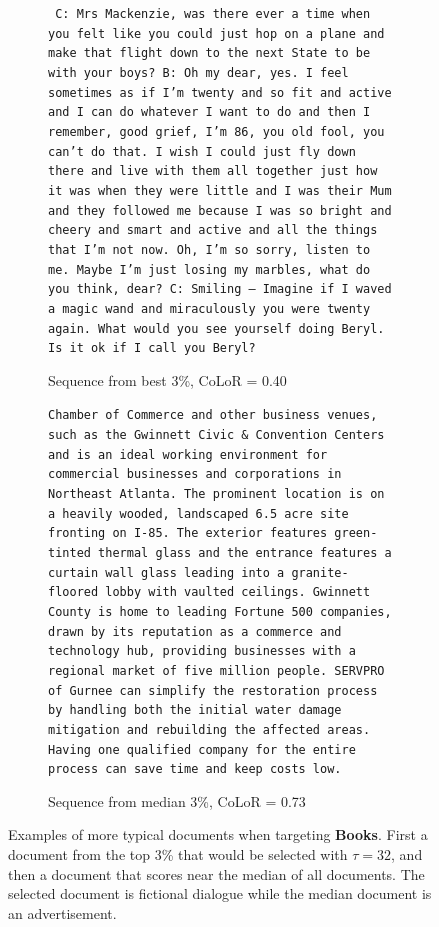 \documentclass{article}
\begin{document}
\begin{figure}[h]
    \begin{subfigure}[b]{0.45\textwidth}
        \centering
        {\small
        \texttt{
    C: Mrs Mackenzie, was there ever a time when you felt like you could just hop on a plane and make that flight down to the next State to be with your boys?
B: Oh my dear, yes. I feel sometimes as if I’m twenty and so fit and active and I can do whatever I want to do and then I remember, good grief, I’m 86, you old fool, you can’t do that. I wish I could just fly down there and live with them all together just how it was when they were little and I was their Mum and they followed me because I was so bright and cheery and smart and active and all the things that I’m not now. Oh, I’m so sorry, listen to me. Maybe I’m just losing my marbles, what do you think, dear?
C: Smiling – Imagine if I waved a magic wand and miraculously you were twenty again. What would you see yourself doing Beryl. Is it ok if I call you Beryl?
}}
        \caption{Sequence from best 3\%, CoLoR = 0.40}
    \end{subfigure}
    \hfill
    \begin{subfigure}[b]{0.45\textwidth}
        \centering
        {\small
    \texttt{Chamber of Commerce and other business venues, such as the Gwinnett Civic \& Convention Centers and is an ideal working environment for commercial businesses and corporations in Northeast Atlanta. The prominent location is on a heavily wooded, landscaped 6.5 acre site fronting on I-85. The exterior features green-tinted thermal glass and the entrance features a curtain wall glass leading into a granite-floored lobby with vaulted ceilings. Gwinnett County is home to leading Fortune 500 companies, drawn by its reputation as a commerce and technology hub, providing businesses with a regional market of five million people.                     SERVPRO of Gurnee can simplify the restoration process by handling both the initial water damage mitigation and rebuilding the affected areas. Having one qualified company for the entire process can save time and keep costs low.
    }}
    \caption{Sequence from median 3\%, CoLoR = 0.73}
    \end{subfigure}
    \caption{Examples of more typical documents when targeting \textbf{Books}. First a document from the top 3\% that would be selected with $ \tau = 32$, and then a document that scores near the median of all documents. The selected document is fictional dialogue while the median document is an advertisement.}
    \label{fig:books_typical}
\end{figure}
\end{document}
